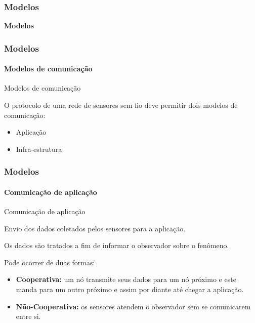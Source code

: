 \documentclass[notes]{beamer}
\begin{document}
\begin{frame}
\label{slide_58}
\frametitle{Modelos}

\begin{block}

 \center \textbf{Modelos}

\end{block}

\end{frame}

\begin{frame}
\label{slide_59}
\frametitle{Modelos}
\framesubtitle{Modelos de comunicação}

\begin{block}{Modelos de comunicação}

O protocolo de uma rede de sensores sem fio deve permitir dois modelos de comunicação: \pause

\begin{itemize}

\item Aplicação \pause
\item Infra-estrutura

\end{itemize}

\end{block}

\end{frame}

\begin{frame}
\label{slide_60}
\frametitle{Modelos}
\framesubtitle{Comunicação de aplicação}

\begin{block}{Comunicação de aplicação}

Envio dos dados coletados pelos sensores para a aplicação.

\end{block} \pause

\begin{block}

Os dados são tratados a fim de informar o observador sobre o fenômeno.

\end{block} \pause

\begin{block}

Pode ocorrer de duas formas: \pause

\begin{itemize}

\item \textbf{Cooperativa:} um nó transmite seus dados para um nó próximo e este manda para um outro próximo e assim por diante até chegar a aplicação. \pause
\item \textbf{Não-Cooperativa:} os sensores atendem o observador sem se comunicarem entre si. 

\end{itemize}

\end{block}

\end{frame}
\end{document}
